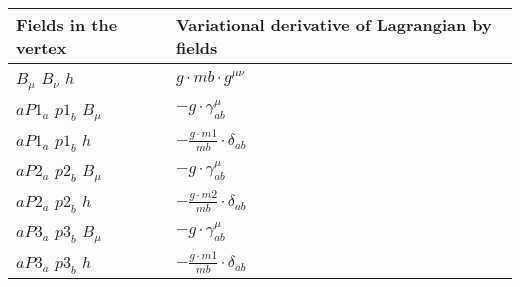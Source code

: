 \textwidth 17cm
\textheight 25cm
\hoffset -3cm
\voffset -1cm
\pagestyle{empty}

\begin{center}

\begin{tabular}{|l|l|} \hline
Fields in the vertex & Variational derivative of Lagrangian by fields \\ \hline
$B{}_{\mu }$ \phantom{-} $B{}_{\nu }$ \phantom{-} ${h}_{}$ \phantom{-}  &
	$ g \cdot mb\cdot g^{\mu \nu} $\\[2mm]
${aP1}_{a }$ \phantom{-} ${p1}_{b }$ \phantom{-} $B{}_{\mu }$ \phantom{-}  &
	$- g\cdot \gamma_{a b}^\mu $\\[2mm]
${aP1}_{a }$ \phantom{-} ${p1}_{b }$ \phantom{-} ${h}_{}$ \phantom{-}  &
	$-\frac{ g \cdot m1}{ mb}\cdot \delta_{a b} $\\[2mm]
${aP2}_{a }$ \phantom{-} ${p2}_{b }$ \phantom{-} $B{}_{\mu }$ \phantom{-}  &
	$- g\cdot \gamma_{a b}^\mu $\\[2mm]
${aP2}_{a }$ \phantom{-} ${p2}_{b }$ \phantom{-} ${h}_{}$ \phantom{-}  &
	$-\frac{ g \cdot m2}{ mb}\cdot \delta_{a b} $\\[2mm]
${aP3}_{a }$ \phantom{-} ${p3}_{b }$ \phantom{-} $B{}_{\mu }$ \phantom{-}  &
	$- g\cdot \gamma_{a b}^\mu $\\[2mm]
${aP3}_{a }$ \phantom{-} ${p3}_{b }$ \phantom{-} ${h}_{}$ \phantom{-}  &
	$-\frac{ g \cdot m1}{ mb}\cdot \delta_{a b} $\\ \hline
\end{tabular}

\end{center}


